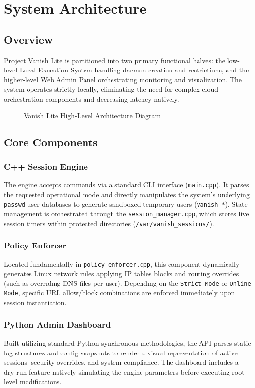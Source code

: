 \chapter{System Architecture}

\section{Overview}
Project Vanish Lite is partitioned into two primary functional halves: the low-level Local Execution System handling daemon creation and restrictions, and the higher-level Web Admin Panel orchestrating monitoring and visualization. The system operates strictly locally, eliminating the need for complex cloud orchestration components and decreasing latency natively.

\begin{figure}[htp]
    \centering
    
    \caption{Vanish Lite High-Level Architecture Diagram}
    \label{fig:architecture}
\end{figure}

\section{Core Components}
\subsection{C++ Session Engine}
The engine accepts commands via a standard CLI interface (\texttt{main.cpp}). It parses the requested operational mode and directly manipulates the system's underlying \texttt{passwd} user databases to generate sandboxed temporary users (\texttt{vanish\_*}). State management is orchestrated through the \texttt{session\_manager.cpp}, which stores live session timers within protected directories (\texttt{/var/vanish\_sessions/}). 

\subsection{Policy Enforcer}
Located fundamentally in \texttt{policy\_enforcer.cpp}, this component dynamically generates Linux network rules applying IP tables blocks and routing overrides (such as overriding DNS files per user). Depending on the \texttt{Strict Mode} or \texttt{Online Mode}, specific URL allow/block combinations are enforced immediately upon session instantiation.

\subsection{Python Admin Dashboard}
Built utilizing standard Python synchronous methodologies, the API parses static log structures and config snapshots to render a visual representation of active sessions, security overrides, and system compliance. The dashboard includes a dry-run feature natively simulating the engine parameters before executing root-level modifications.
